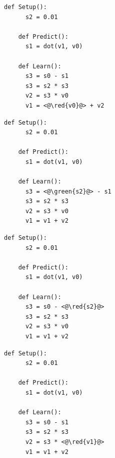 \documentclass[11pt,oneside,openany,report]{jsbook}
\newcommand{\red}[1]{\textcolor{red}{#1}}
\newcommand{\green}[1]{\textcolor[rgb]{0.1,0.6,0.1}{\textbf{#1}}}
\begin{document}
\begin{multicols}{2}
  \begin{lstlisting}[caption=Learn関数において代入される学習対象のパラメータ$v1$が代入前の自身に依存しておらず\, 妥当ではないアルゴリズムの例. 妥当なアルゴリズムCode. \ref{code:valid_algorithm}との差分を赤字で示す. ,label=code:invalid_algorithm_4]
    def Setup():
      s2 = 0.01

    def Predict():
      s1 = dot(v1, v0)

    def Learn():
      s3 = s0 - s1
      s3 = s2 * s3
      v2 = s3 * v0
      v1 = <@\red{v0}@> + v2
  \end{lstlisting}

  \columnbreak

  \begin{lstlisting}[caption=Learn関数において代入される学習対象のパラメータ$v1$がLearn関数の実行前に代入される正解ラベル$s0$に依存しておらず\, 妥当ではないアルゴリズムの例. 妥当なアルゴリズムCode. \ref{code:valid_algorithm}との差分を赤字で示す. ,label=code:invalid_algorithm_5]
    def Setup():
      s2 = 0.01

    def Predict():
      s1 = dot(v1, v0)

    def Learn():
      s3 = <@\green{s2}@> - s1
      s3 = s2 * s3
      v2 = s3 * v0
      v1 = v1 + v2
  \end{lstlisting}
\end{multicols}

\newpage

\begin{multicols}{2}
  \begin{lstlisting}[caption=Learn関数において代入される学習対象のパラメータ$v1$が直前のPredict関数で代入した予測ラベル$s1$に依存しておらず\, 妥当ではないアルゴリズムの例. 妥当なアルゴリズムCode. \ref{code:valid_algorithm}との差分を赤字で示す. ,label=code:invalid_algorithm_6]
    def Setup():
      s2 = 0.01

    def Predict():
      s1 = dot(v1, v0)

    def Learn():
      s3 = s0 - <@\red{s2}@>
      s3 = s2 * s3
      v2 = s3 * v0
      v1 = v1 + v2
  \end{lstlisting}

  \columnbreak

  \begin{lstlisting}[caption=Learn関数において代入される学習対象のパラメータ$v1$が直前のPredict関数の実行前に代入される入力ベクトル$v0$に依存しておらず\, 妥当ではないアルゴリズムの例. 妥当なアルゴリズムCode. \ref{code:valid_algorithm}との差分を赤字で示す. ,label=code:invalid_algorithm_7]
    def Setup():
      s2 = 0.01

    def Predict():
      s1 = dot(v1, v0)

    def Learn():
      s3 = s0 - s1
      s3 = s2 * s3
      v2 = s3 * <@\red{v1}@>
      v1 = v1 + v2
  \end{lstlisting}
\end{multicols}
\end{document}
